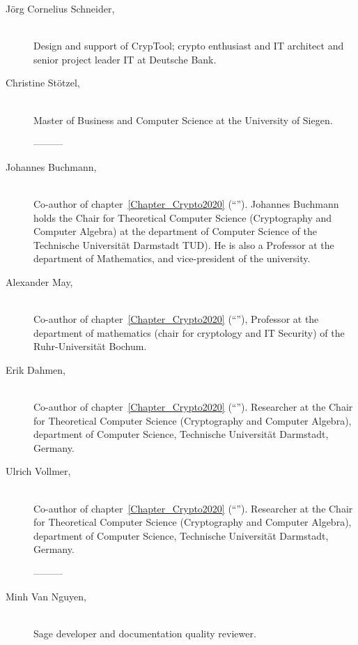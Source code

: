 \begin{description}
\item[J\"org Cornelius Schneider,] \mbox{}\\
Design and support of CrypTool; crypto enthusiast and IT architect and
senior project leader IT at Deutsche Bank.

\item[Christine St\"otzel,] \mbox{}\\
Master of Business and Computer Science at the University of Siegen.

---------

\item[Johannes Buchmann,] \mbox{}\\
Co-author of chapter~\ref{Chapter_Crypto2020} (``'').
Johannes Buchmann holds the Chair for Theoretical Computer Science (Cryptography
and Computer Algebra) at the department of Computer Science of the Technische
Universit\"at Darmstadt TUD).  He is also a Professor at the department of Mathematics, and vice-president of the university.

\item[Alexander May,] \mbox{}\\
Co-author of chapter~\ref{Chapter_Crypto2020} (``''), 
Professor at the department of mathematics (chair for cryptology and IT Security) of the Ruhr-Universit\"at Bochum.


\item[Erik Dahmen,] \mbox{}\\
Co-author of chapter~\ref{Chapter_Crypto2020} (``''). 
Researcher at the Chair for Theoretical Computer Science (Cryptography and
Computer Algebra), department of Computer Science, Technische Universit\"at
Darmstadt, Germany.

\item[Ulrich Vollmer,] \mbox{}\\
Co-author of chapter~\ref{Chapter_Crypto2020} (``'').
Researcher at the Chair for Theoretical Computer Science (Cryptography and
Computer Algebra), department of Computer Science, Technische Universit\"at
Darmstadt, Germany.

---------

\item[Minh Van Nguyen,] \mbox{}\\
Sage developer and documentation quality reviewer.



\end{description}

